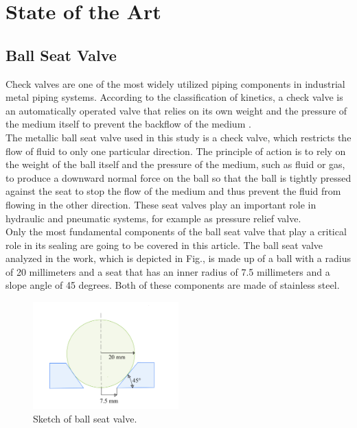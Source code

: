\chapter{State of the Art}
\label{ch:State of the Art}

\section{Ball Seat Valve}
\label{Ball Seat Valve}

Check valves are one of the most widely utilized piping components in industrial metal piping systems. 
According to the classification of kinetics, a check valve is an automatically operated valve that
relies on its own weight and the pressure of the medium itself to prevent the backflow 
of the medium \cite{kineticsValve}. \\

The metallic ball seat valve used in this study is a check valve, which restricts the flow of fluid to
only one particular direction. The principle of action is to rely on the weight of the ball itself and 
the pressure of the medium, such as fluid or gas, to produce a downward normal force on the ball 
so that the ball is tightly pressed against the seat to stop the flow of the medium and thus prevent 
the fluid from flowing in the other direction. These seat valves play an important 
role in hydraulic and pneumatic systems, for example as pressure relief valve.\\


Only the most fundamental components of the ball seat valve that play a critical role in its sealing 
are going to be covered in this article. The ball seat valve analyzed in the work, which is depicted in Fig., is made 
up of a ball with a radius of 20 millimeters and a seat that has an inner radius 
of 7.5 millimeters and a slope angle of 45 degrees. Both of these components are made of stainless steel.\\

\begin{figure}[htbp]
    \centering
    \includegraphics[width=0.5\textwidth]{figures/BallSeatValve/ballseatvalve.jpg}
    \caption{Sketch of ball seat valve.}
    \label{fig:ballseatvalve}
\end{figure}

